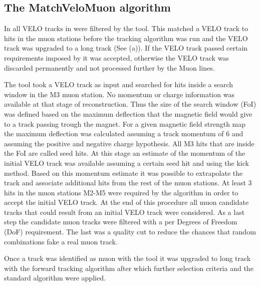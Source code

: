 \subsection{The MatchVeloMuon algorithm}
\label{sec:muon_matching}

In \runone all VELO tracks in \hltone were filtered by the \mvm tool. This matched a VELO track to hits in the muon
stations before the \FwD tracking algorithm was run and the VELO track was upgraded to a long track (See (a)).
If the VELO track passed certain requirements imposed by \mvm it was accepted, otherwise the VELO track was discarded
permanently and not processed further by the \hltone Muon lines.

The \mvm tool took a VELO track as input and searched for hits inside a search window in the M3 muon station.
No momentum or charge information was available at that stage of reconstruction. Thus the size of the search window (FoI)
was defined based on the maximum deflection that the magnetic field would give to a track passing trough the
\lhcb magnet. For a given magnetic field strength map the maximum deflection was calculated assuming
a track momentum of 6 \gevc and assuming the positive and negative charge hypothesis.
All M3 hits that are inside the FoI are called seed hits.
At this stage an estimate of the momentum of the initial VELO track was available assuming a certain seed hit
and using the kick method\cite{CERN-THESIS-2015-102}. Based on this momentum estimate it was possible
to extrapolate the track and associate additional hits from the rest of the muon stations.
At least 3 hits in the muon stations M2-M5 were required by the algorithm in order to accept the initial VELO track.
At the end of this procedure all muon candidate tracks that could result from an initial VELO track were considered.
As a last step the candidate muon tracks were filtered with a \chisq per Degrees of Freedom (DoF) requirement.
The last was a quality cut to reduce the chances that random combinations fake a real muon track.

Once a track was identified as muon with the \mvm tool it was upgraded to long track with
the forward tracking algorithm after which further selection criteria and the standard  algorithm were applied.


